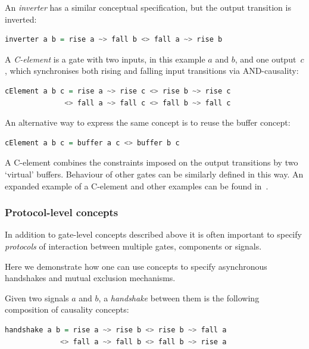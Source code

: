 \documentclass[british,conference,compsoc]{IEEEtran}
\begin{document}
\noindent An \emph{inverter} has a similar conceptual specification, but the
output transition is inverted:

\begin{lstlisting}[language=haskell]
inverter a b = rise a ~> fall b <> fall a ~> rise b
\end{lstlisting}

\noindent A \emph{C-element} is a gate with two inputs, in this example $a$ and $b$, and one
output~$c$, which synchronises both rising and falling input transitions
via AND-causality:

\begin{lstlisting}[language=haskell]
cElement a b c = rise a ~> rise c <> rise b ~> rise c
              <> fall a ~> fall c <> fall b ~> fall c
\end{lstlisting}

An alternative way to express the same concept is to reuse the buffer concept:

\begin{lstlisting}[language=haskell]
    cElement a b c = buffer a c <> buffer b c
\end{lstlisting}

A C-element combines the constraints imposed on the output
transitions by two `virtual' buffers. Behaviour of other gates can be similarly
defined in this way. An expanded example of a C-element and other examples can 
be found in~\cite{2015_Beaumont_MEMOCODE}.

\vspace{-2mm}

\subsubsection{Protocol-level concepts} In addition to gate-level concepts
described above it is often important to specify \emph{protocols}
of interaction between multiple gates, components or signals. 

Here we demonstrate how one can use concepts to specify asynchronous handshakes
and mutual exclusion mechanisms.

Given two signals $a$ and $b$, a \emph{handshake} between them is
the following composition of causality concepts:

\begin{lstlisting}[language=haskell]
handshake a b = rise a ~> rise b <> rise b ~> fall a 
             <> fall a ~> fall b <> fall b ~> rise a
\end{lstlisting}
\end{document}
